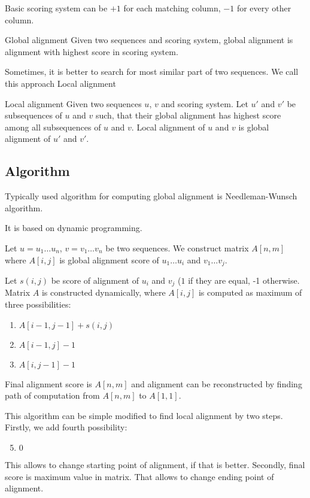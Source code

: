 Basic scoring system can be $+1$ for each matching column, $-1$ for every other column.

\begin{definition}{Global alignment}
Given two sequences and scoring system, global alignment is alignment with highest score in scoring system.
\end{definition}

Sometimes, it is better to search for most similar part of two sequences. We call this approach Local alignment

\begin{definition}{Local alignment}
Given two sequences $u$, $v$ and scoring system. Let $u'$ and $v'$ be subsequences of $u$ and $v$ such, that their global alignment has highest score among all subsequences of $u$ and $v$. Local alignment of $u$ and $v$ is global alignment of $u'$ and $v'$.
\end{definition}

\subsection{Algorithm}
Typically used algorithm for computing global alignment is Needleman-Wunsch algorithm.

It is based on dynamic programming. 

Let $u=u_1 \dots u_n$, $v=v_1 \dots v_n$ be two sequences. We construct matrix $A[n,m]$ where $A[i,j]$ is global alignment score of $u_1 \dots u_i$ and $v_1 \dots v_j$.

Let $s(i,j)$ be score of alignment of $u_i$ and $v_j$ ($1$ if they are equal, -1 otherwise.
Matrix $A$ is constructed dynamically, where $A[i,j]$ is computed as maximum of three possibilities:
\begin{enumerate}
\item $A[i-1,j-1]+s(i,j)$
\item $A[i-1,j]-1$
\item $A[i,j-1]-1$
\end{enumerate}

Final alignment score is $A[n,m]$ and alignment can be reconstructed by finding path of computation from $A[n,m]$ to $A[1,1]$.

This algorithm can be simple modified to find local alignment by two steps.
Firstly, we add fourth possibility:
\begin{enumerate}
 \setcounter{enumi}{4}
\item $0$
\end{enumerate}
This allows to change starting point of alignment, if that is better.
Secondly, final score is maximum value in matrix. That allows to change ending point of alignment.


